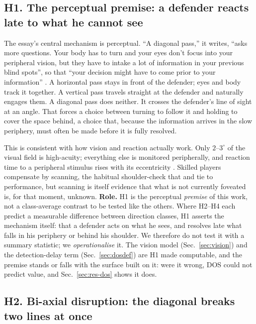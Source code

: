 \documentclass[11pt]{article}
\begin{document}
\subsection{H1. The perceptual premise: a defender reacts late to what he cannot see}
\label{sec:h1}

The essay's central mechanism is perceptual. ``A diagonal pass,'' it
writes, ``asks more questions. Your body has to turn and your eyes don't
focus into your peripheral vision, but they have to intake a lot of
information in your previous blind spots'', so that ``your decision
might have to come prior to your information'' \citep{spielverlagerung2025}.
A horizontal pass stays in front of the defender; eyes and body track it
together. A vertical pass travels straight at the defender and naturally
engages them. A diagonal pass does neither. It crosses the defender's line
of sight at an angle. That forces a choice between turning to follow it and
holding to cover the space behind, a choice that, because the
information arrives in the slow periphery, must often be made before it is
fully resolved.

This is consistent with how vision and reaction actually work. Only
$2$--$3^\circ$ of the visual field is high-acuity; everything else is
monitored peripherally, and reaction time to a peripheral stimulus rises
with its eccentricity \citep{vater2024}. Skilled players compensate by
scanning, the habitual shoulder-check that \citet{jordet2013} and
\citet{mcguckian2018} tie to performance, but scanning is itself
evidence that what is not currently foveated is, for that moment, unknown.
\textbf{Role.} H1 is the perceptual \emph{premise} of this work, not a
class-average contrast to be tested like the others. Where H2--H4 each
predict a measurable difference between direction classes, H1 asserts the
mechanism itself: that a defender acts on what he sees, and resolves
late what falls in his periphery or behind his shoulder. We therefore do
not test it with a summary statistic; we \emph{operationalise} it. The
vision model (Sec.~\ref{sec:vision}) and the detection-delay term
(Sec.~\ref{sec:dosdef}) are H1 made computable, and the premise stands or
falls with the surface built on it: were it wrong, DOS could not predict
value, and Sec.~\ref{sec:res-dos} shows it does.

\subsection{H2. Bi-axial disruption: the diagonal breaks two lines at once}
\label{sec:h2}
\end{document}
